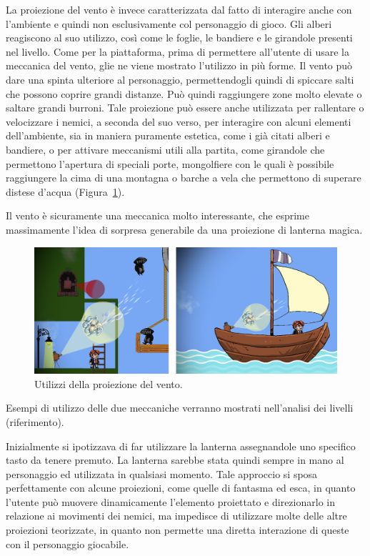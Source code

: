 La proiezione del vento è invece caratterizzata dal fatto di interagire anche con l’ambiente e quindi non esclusivamente col personaggio di gioco. Gli alberi reagiscono al suo utilizzo, così come le foglie, le bandiere e le girandole presenti nel livello.
Come per la piattaforma, prima di permettere all’utente di usare la meccanica del vento, glie ne viene mostrato l’utilizzo in più forme.
Il vento può dare una spinta ulteriore al personaggio, permettendogli quindi di spiccare salti che possono coprire grandi distanze. Può quindi raggiungere zone molto elevate o saltare grandi burroni.
Tale proiezione può essere anche utilizzata per rallentare o velocizzare i nemici, a seconda del suo verso, per interagire con alcuni elementi dell’ambiente, sia in maniera puramente estetica, come i già citati alberi e bandiere, o per attivare meccanismi utili alla partita, come girandole che permettono l’apertura di speciali porte, mongolfiere con le quali è possibile raggiungere la cima di una montagna o barche a vela che permettono di superare distese d’acqua (Figura~\ref{fig:meccaniche_precinema_vento}).

Il vento è sicuramente una meccanica molto interessante, che esprime massimamente l’idea di sorpresa generabile da una proiezione di lanterna magica.

\begin{figure}%
	\centering
	\includegraphics[width= \columnwidth]{images/gameDesign/20_vento.jpg}
	\caption{Utilizzi della proiezione del vento.}
	\label{fig:meccaniche_precinema_vento}
\end{figure}

Esempi di utilizzo delle due meccaniche verranno mostrati nell’analisi dei livelli (riferimento).

Inizialmente si ipotizzava di far utilizzare la lanterna assegnandole uno specifico tasto da tenere premuto. La lanterna sarebbe stata quindi sempre in mano al personaggio ed utilizzata in qualsiasi momento. Tale approccio si sposa perfettamente con alcune proiezioni, come quelle di fantasma ed esca, in quanto l’utente può muovere dinamicamente l’elemento proiettato e direzionarlo in relazione ai movimenti dei nemici, ma impedisce di utilizzare molte delle altre proiezioni teorizzate, in quanto non permette una diretta interazione di queste con il personaggio giocabile.

